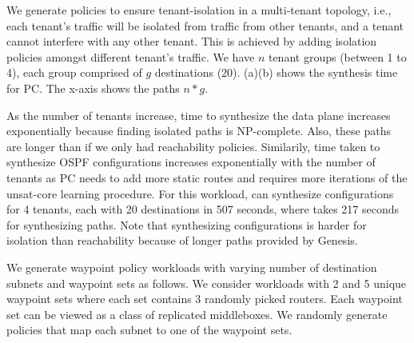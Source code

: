 We generate policies to ensure tenant-isolation
in a multi-tenant topology, i.e., each
tenant's traffic will be isolated from traffic from
other tenants, and a tenant cannot interfere with any 
other tenant. This is achieved by adding isolation policies
amongst different tenant's traffic. 
We have $n$ tenant groups (between 1 to 4), 
each group comprised of $g$ destinations (20). 
(a)(b)
shows the synthesis time 
for PC.
The x-axis shows the paths $n * g$. 
 
 

As the number of tenants increase, time to 
synthesize the data plane increases exponentially 
because finding isolated paths is NP-complete. Also, these
paths are longer than if we only had reachability policies. 
Similarily, time taken to synthesize 
OSPF configurations increases exponentially with the 
number of tenants as PC needs to add more static routes 
and requires more iterations of the unsat-core learning
procedure. 
For this workload, \name can
synthesize configurations for 4 tenants, each with
20 destinations in 507 seconds, where \genesis takes 217 seconds
for synthesizing paths. Note that synthesizing 
configurations is harder for isolation than reachability 
because of longer paths provided by Genesis.

We generate waypoint policy 
workloads with varying number of destination subnets and 
waypoint sets as follows. 
We consider workloads with 2 and 5 unique waypoint 
sets where each set contains 3 randomly picked routers.  
Each waypoint set can be 
viewed as a class of replicated middleboxes.
We randomly generate policies 
that map each subnet to one of the waypoint sets. 

